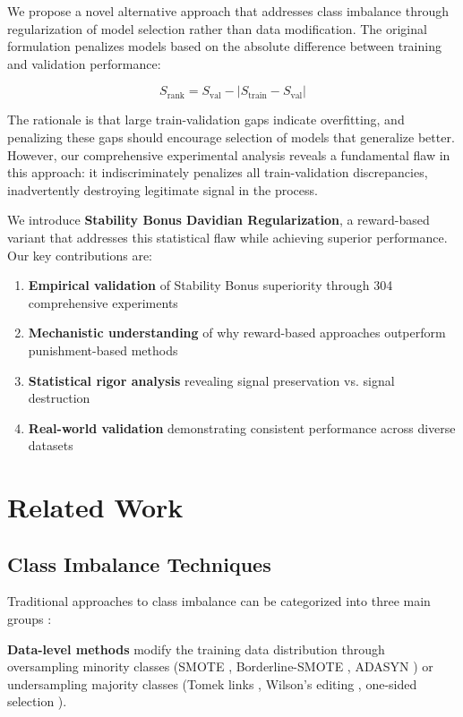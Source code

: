 \documentclass[11pt,twocolumn]{article}
\begin{document}
We propose a novel alternative approach that addresses class imbalance through regularization of model selection rather than data modification. The original formulation penalizes models based on the absolute difference between training and validation performance:

\begin{equation}
S_{\text{rank}} = S_{\text{val}} - |S_{\text{train}} - S_{\text{val}}|
\end{equation}

The rationale is that large train-validation gaps indicate overfitting, and penalizing these gaps should encourage selection of models that generalize better. However, our comprehensive experimental analysis reveals a fundamental flaw in this approach: it indiscriminately penalizes all train-validation discrepancies, inadvertently destroying legitimate signal in the process.

We introduce \textbf{Stability Bonus Davidian Regularization}, a reward-based variant that addresses this statistical flaw while achieving superior performance. Our key contributions are:

\begin{enumerate}
    \item \textbf{Empirical validation} of Stability Bonus superiority through 304 comprehensive experiments
    \item \textbf{Mechanistic understanding} of why reward-based approaches outperform punishment-based methods
    \item \textbf{Statistical rigor analysis} revealing signal preservation vs. signal destruction
    \item \textbf{Real-world validation} demonstrating consistent performance across diverse datasets
\end{enumerate}

\section{Related Work}

\subsection{Class Imbalance Techniques}
Traditional approaches to class imbalance can be categorized into three main groups \cite{fernandez2018learning,haixiang2017learning}:

\textbf{Data-level methods} modify the training data distribution through oversampling minority classes (SMOTE \cite{chawla2002smote}, Borderline-SMOTE \cite{han2005borderline}, ADASYN \cite{he2008adasyn}) or undersampling majority classes (Tomek links \cite{tomek1976two}, Wilson's editing \cite{wilson1972asymptotic}, one-sided selection \cite{kubat1997addressing}).
\end{document}
